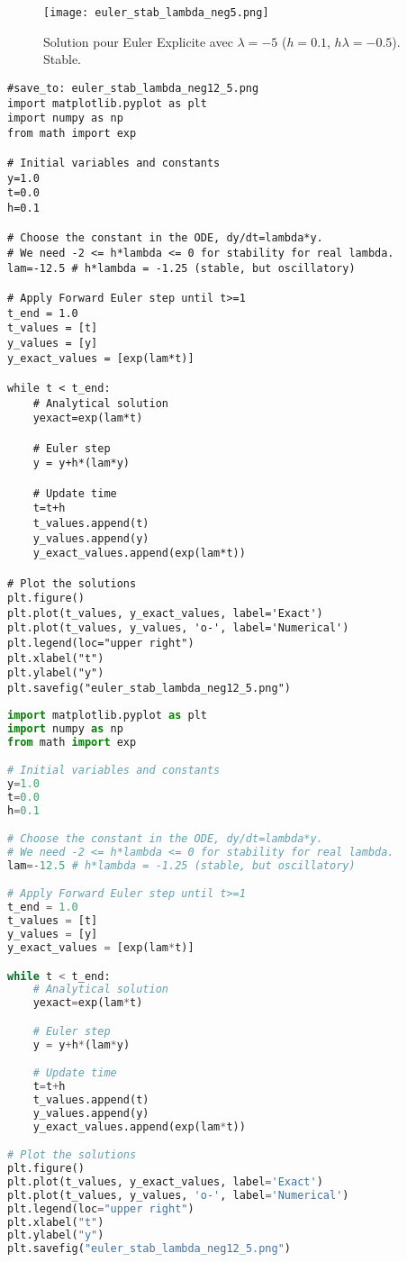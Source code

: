\documentclass{article}
\begin{document}
\begin{figure}[H]
\centering
\texttt{[image: euler\_stab\_lambda\_neg5.png]}
\caption{Solution pour Euler Explicite avec $\lambda=-5$ ($h=0.1$, $h\lambda=-0.5$). Stable.}
\label{fig:euler_stab_neg5}
\end{figure}

\begin{verbatim}
#save_to: euler_stab_lambda_neg12_5.png
import matplotlib.pyplot as plt
import numpy as np
from math import exp

# Initial variables and constants
y=1.0
t=0.0
h=0.1

# Choose the constant in the ODE, dy/dt=lambda*y.
# We need -2 <= h*lambda <= 0 for stability for real lambda.
lam=-12.5 # h*lambda = -1.25 (stable, but oscillatory)

# Apply Forward Euler step until t>=1
t_end = 1.0
t_values = [t]
y_values = [y]
y_exact_values = [exp(lam*t)]

while t < t_end:
    # Analytical solution
    yexact=exp(lam*t)

    # Euler step
    y = y+h*(lam*y)

    # Update time
    t=t+h
    t_values.append(t)
    y_values.append(y)
    y_exact_values.append(exp(lam*t))

# Plot the solutions
plt.figure()
plt.plot(t_values, y_exact_values, label='Exact')
plt.plot(t_values, y_values, 'o-', label='Numerical')
plt.legend(loc="upper right")
plt.xlabel("t")
plt.ylabel("y")
plt.savefig("euler_stab_lambda_neg12_5.png")
\end{verbatim}
\begin{lstlisting}[language=Python, caption=Code Python pour Euler Explicite oscillatoire stable, label=code:euler_stab_neg12_5]
import matplotlib.pyplot as plt
import numpy as np
from math import exp

# Initial variables and constants
y=1.0
t=0.0
h=0.1

# Choose the constant in the ODE, dy/dt=lambda*y.
# We need -2 <= h*lambda <= 0 for stability for real lambda.
lam=-12.5 # h*lambda = -1.25 (stable, but oscillatory)

# Apply Forward Euler step until t>=1
t_end = 1.0
t_values = [t]
y_values = [y]
y_exact_values = [exp(lam*t)]

while t < t_end:
    # Analytical solution
    yexact=exp(lam*t)

    # Euler step
    y = y+h*(lam*y)

    # Update time
    t=t+h
    t_values.append(t)
    y_values.append(y)
    y_exact_values.append(exp(lam*t))

# Plot the solutions
plt.figure()
plt.plot(t_values, y_exact_values, label='Exact')
plt.plot(t_values, y_values, 'o-', label='Numerical')
plt.legend(loc="upper right")
plt.xlabel("t")
plt.ylabel("y")
plt.savefig("euler_stab_lambda_neg12_5.png")
\end{lstlisting}
\end{document}
